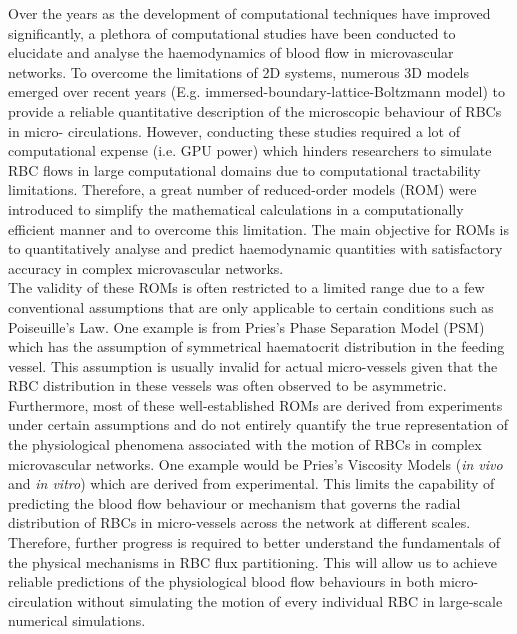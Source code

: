 \noindent Over the years as the development of computational techniques have improved significantly, a plethora of computational studies\cite{Noguchi14159, DoddiSaiK2009Tcmo, Freund2014, Balogh2017DirectNetworks, 2020Charles, YAN199117, Possenti2019, EndenG1994ANSo, MehrabadiMarmar2015ACMf, VahidkhahKoohyar2014PDiT, HariprasadSecomb2014, Zhou2021EmergentBifurcations} have been conducted to elucidate and analyse the haemodynamics of blood flow in microvascular networks. To overcome the limitations of 2D systems, numerous 3D models emerged over recent years (E.g. immersed-boundary-lattice-Boltzmann model) to provide a reliable quantitative description of the microscopic behaviour of RBCs in micro- circulations.\cite{KrugerTimm2012Csso} However, conducting these studies required a lot of computational expense (i.e. GPU power) which hinders researchers to simulate RBC flows in large computational domains due to computational tractability limitations. Therefore, a great number of reduced-order models (ROM) were introduced to simplify the mathematical calculations in a computationally efficient manner and to overcome this limitation.\cite{A.R.Pries2005Mbvi, Romain2020, Bernabeu2020AbnormalOxygenation, Gould2015HematocritNetworks, PRIES198981, PriesAR1994RtBF} The main objective for ROMs is to quantitatively analyse and predict haemodynamic quantities with satisfactory accuracy in complex microvascular networks. \\

\noindent The validity of these ROMs is often restricted to a limited range due to a few conventional assumptions that are only applicable to certain conditions such as Poiseuille's Law. One example is from Pries's Phase Separation Model (PSM)\cite{A.R.Pries2005Mbvi, PriesAR1990BFiM, PRIES198981} which has the assumption of symmetrical haematocrit distribution in the feeding vessel. This assumption is usually invalid for actual micro-vessels given that the RBC distribution in these vessels was often observed to be asymmetric.\cite{2020Charles, Balogh2017DirectNetworks, Barber2011SimulatedPartitioning, Roman2016} Furthermore, most of these well-established ROMs are derived from experiments under certain assumptions and do not entirely quantify the true representation of the physiological phenomena associated with the motion of RBCs in complex microvascular networks. One example would be Pries's Viscosity Models (\textit{in vivo}\cite{PriesAR1994RtBF} and \textit{in vitro}\cite{Pries1992BloodHematocrit}) which are derived from experimental. This limits the capability of predicting the blood flow behaviour or mechanism that governs the radial distribution of RBCs in micro-vessels across the network at different scales. Therefore, further progress is required to better understand the fundamentals of the physical mechanisms in RBC flux partitioning. This will allow us to achieve reliable predictions of the physiological blood flow behaviours in both micro-circulation without simulating the motion of every individual RBC in large-scale numerical simulations. 